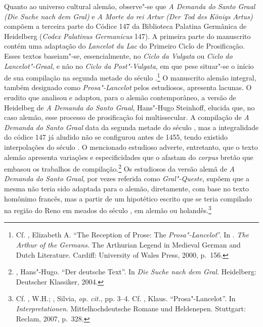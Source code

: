 Quanto ao universo cultural alemão, observe"-se que  \textit{A Demanda do Santo
Graal} \textit{(Die Suche nach dem Gral) }e \textit{A Morte do rei Artur (Der
Tod des Königs Artus)} compõem a terceira parte do Códice 147 da Biblioteca
Palatina Germânica de Heidelberg (\textit{Codex Palatinus Germanicus} 147). A
primeira parte do manuscrito contém uma adaptação do \textit{Lancelot du Lac} do
Primeiro Ciclo de Prosificação. Esses textos baseiam"-se, essencialmente, no
\textit{Ciclo da Vulgata} ou \textit{Ciclo do Lancelot"-Graal}, e não no
\textit{Ciclo da Post"-Vulgata}, em que pese situar"-se o início de sua compilação
na segunda metade do século .\footnote{ Cf. , Elizabeth A.
“The Reception of Prose: The \textit{Prosa"-Lancelot}”. In . \textit{The
Arthur of the Germans}. The Arthurian Legend in Medieval German and Dutch
Literature. Cardiff: University of Wales Press, 2000, p.~156. } O manuscrito
alemão integral, também designado como \textit{Prosa"-Lancelot} pelos estudiosos,
apresenta lacunas. O erudito que analisou e adaptou, para o alemão
contemporâneo, a versão de Heidelbeg de\textit{ A Demanda do Santo Graal},
Hans"-Hugo Steinhoff, elucida que, no caso alemão, esse processo de prosificação
foi multissecular. A compilação de \textit{A Demanda do Santo Graal} data da
segunda metade do século , mas a integralidade do códice 147 já aludido não
se configurou antes de 1455, tendo existido interpolações do século
. O mencionado estudioso adverte, entretanto, que o texto alemão
apresenta variações e especificidades que o afastam do \textit{corpus} bretão
que embasou os trabalhos de compilação.\footnote{ , Hans"-Hugo. “Der
deutsche Text”.  In \textit{Die Suche nach dem Gral. }Heidelberg: Deutscher
Klassiker, 2004.  } Os estudiosos da versão alemã de \textit{A Demanda
do Santo Graal}, por vezes referida como \textit{Gral"-Queste}, supõem que a
mesma não teria sido adaptada para o alemão, diretamente, com base no texto
homônimo francês, mas a partir de um hipotético escrito que se teria compilado
na região do Reno em meados do século , em alemão ou
holandês.\footnote{ Cf. , W.H.;  , Silvia, \textit{op. cit.}, pp.
3--4. Cf. , Klaus.  “Prosa"-Lancelot”. In
\textit{Interpretationen}. Mittelhochdeutsche Romane und Heldenepen. Stuttgart:
Reclam, 2007, p.~328. }

